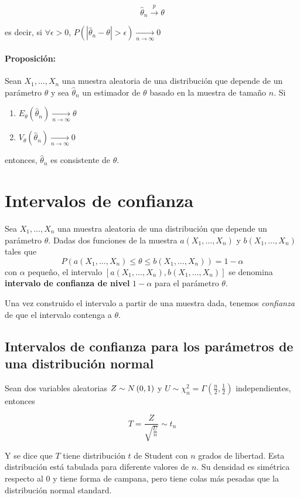 $$\hat{\theta}_n\overset{p}{\longrightarrow} \theta$$

es decir, si $\forall\epsilon > 0$, $P(|\hat{\theta}_n-\theta| >  \epsilon)\underset{n\to\infty}{\longrightarrow}0$

\paragraph{Proposición:} Sean $X_1,\dots,X_n$ una muestra aleatoria de una distribución que depende de un parámetro $\theta$ y sea $\hat{\theta}_n$ un estimador de $\theta$ basado en la muestra de tamaño $n$. Si 
\begin{enumerate}
	 \item $E_\theta(\hat{\theta}_n)\underset{n\to\infty}{\longrightarrow}\theta$
	 \item $V_\theta (\hat{\theta}_n)\underset{n\to\infty}{\longrightarrow}0$
\end{enumerate}
entonces, $\hat{\theta}_n$ es consistente de $\theta$.
\section{Intervalos de confianza}
Sea $X_1,\dots,X_n$ una muestra aleatoria de una distribución que depende un parámetro $\theta$. Dadas dos funciones de la muestra $a(X_1,\dots,X_n)$ y $b(X_1,\dots,X_n)$ tales que 
$$P(a(X_1,\dots,X_n)\leq \theta\leq b(X_1,\dots,X_n)) = 1-\alpha$$
con $\alpha$ pequeño, el intervalo $[a(X_1,\dots,X_n),b(X_1,\dots,X_n)]$ se denomina \textbf{intervalo de confianza de nivel} $1-\alpha$ para el parámetro $\theta$.

Una vez construido el intervalo a partir de una muestra dada, tenemos \textit{confianza} de que el intervalo contenga a $\theta$.

\subsection{Intervalos de confianza para los parámetros de una distribución normal}
Sean dos variables aleatorias $Z\sim N\left(0,1\right)$ y $U\sim\chi^2_n = \Gamma\left(\frac{n}{2}, \frac{1}{2}\right)$ independientes, entonces

$$T = \frac{Z}{\sqrt{\frac{U}{n}}}\sim t_n$$

Y se dice que $T$ tiene distribución $t$ de Student con $n$ grados de libertad. Esta distribución está tabulada para diferente valores de $n$. Su densidad es simétrica respecto al 0 y tiene forma de campana, pero tiene colas más pesadas que la distribución normal standard.

